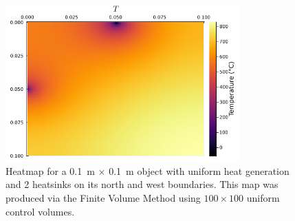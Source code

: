 \begin{figure}
	\centering
	\includegraphics[width=0.8\textwidth]{Chapter_I_Background/Images/T-Heatmap_2_Heatsinks.png}
	\caption[Heatmap Example]{Heatmap for a \SI{0.1}{\meter} $\times$ \SI{0.1}{\meter} object with uniform heat generation and 2 heatsinks on its north and west boundaries. This map was produced via the Finite Volume Method using $100\times 100$ uniform control volumes.}
\end{figure}